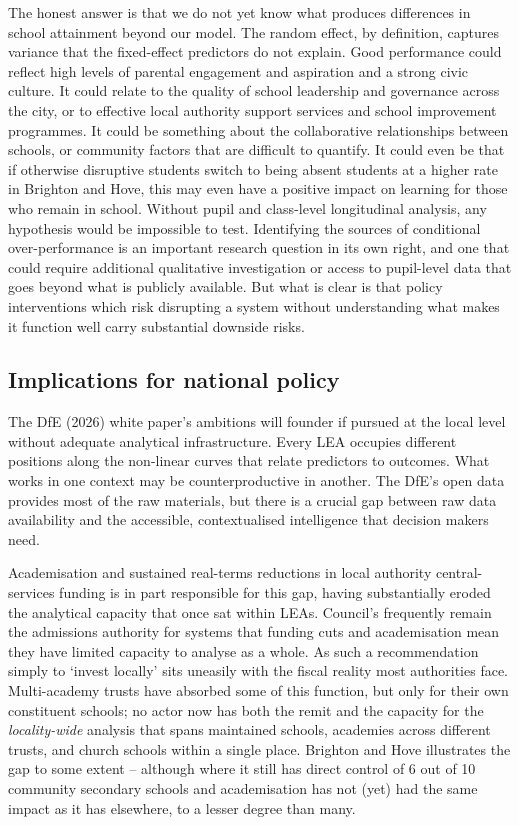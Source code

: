 \documentclass[
  12pt,
  titlepage]{article}
\begin{document}
The honest answer is that we do not yet know what produces differences
in school attainment beyond our model. The random effect, by definition,
captures variance that the fixed-effect predictors do not explain. Good
performance could reflect high levels of parental engagement and
aspiration and a strong civic culture. It could relate to the quality of
school leadership and governance across the city, or to effective local
authority support services and school improvement programmes. It could
be something about the collaborative relationships between schools, or
community factors that are difficult to quantify. It could even be that
if otherwise disruptive students switch to being absent students at a
higher rate in Brighton and Hove, this may even have a positive impact
on learning for those who remain in school. Without pupil and
class-level longitudinal analysis, any hypothesis would be impossible to
test. Identifying the sources of conditional over-performance is an
important research question in its own right, and one that could require
additional qualitative investigation or access to pupil-level data that
goes beyond what is publicly available. But what is clear is that policy
interventions which risk disrupting a system without understanding what
makes it function well carry substantial downside risks.

\subsection{Implications for national
policy}\label{implications-for-national-policy}

The DfE (2026) white paper's ambitions will founder if pursued at the
local level without adequate analytical infrastructure. Every LEA
occupies different positions along the non-linear curves that relate
predictors to outcomes. What works in one context may be
counterproductive in another. The DfE's open data provides most of the
raw materials, but there is a crucial gap between raw data availability
and the accessible, contextualised intelligence that decision makers
need.

Academisation and sustained real-terms reductions in local authority
central-services funding is in part responsible for this gap, having
substantially eroded the analytical capacity that once sat within LEAs.
Council's frequently remain the admissions authority for systems that
funding cuts and academisation mean they have limited capacity to
analyse as a whole. As such a recommendation simply to `invest locally'
sits uneasily with the fiscal reality most authorities face.
Multi-academy trusts have absorbed some of this function, but only for
their own constituent schools; no actor now has both the remit and the
capacity for the \emph{locality-wide} analysis that spans maintained
schools, academies across different trusts, and church schools within a
single place. Brighton and Hove illustrates the gap to some extent --
although where it still has direct control of 6 out of 10 community
secondary schools and academisation has not (yet) had the same impact as
it has elsewhere, to a lesser degree than many.
\end{document}
